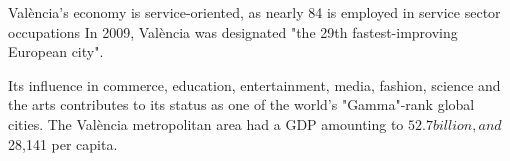 \documentclass{article}
\begin{document}
València's economy is service-oriented, as nearly 84%
is employed in service sector occupations In 2009, València was designated "the
29th fastest-improving European city".  

Its influence in commerce, education, entertainment, media, fashion, science
and the arts contributes to its status as one of the world's "Gamma"-rank
global cities. The València metropolitan area had a GDP amounting to $52.7
billion, and $28,141 per capita.

\end{document}
